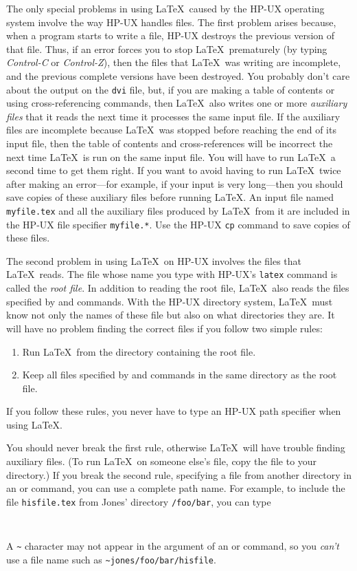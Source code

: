 \documentclass{article}
\begin{document}
The only special problems in using \LaTeX\ caused by the HP-UX
operating system involve the way HP-UX handles files.  The first
problem arises because, when a program starts to write a file, HP-UX
destroys the previous version of that file.  Thus, if an error forces
you to stop \LaTeX\ prematurely (by typing {\em Control-C\/} or {\em
Control-Z\/}), then the files that \LaTeX\ was writing are incomplete,
and the previous complete versions have been destroyed.  You probably
don't care about the output on the {\tt dvi} file, but, if you are
making a table of contents or using cross-referencing commands, then
\LaTeX\ also writes one or more {\em auxiliary files\/} that it reads
the next time it processes the same input file.  If the auxiliary files
are incomplete because \LaTeX\ was stopped before reaching the end of
its input file, then the table of contents and cross-references will be
incorrect the next time \LaTeX\ is run on the same input file.  You
will have to run \LaTeX\ a second time to get them right.  If you want
to avoid having to run \LaTeX\ twice after making an error---for
example, if your input is very long---then you should save copies of
these auxiliary files before running \LaTeX. An input file named
\mbox{\tt myfile.tex} and all the auxiliary files produced by
\LaTeX\ from it are included in the HP-UX file specifier \mbox{\tt myfile.*}.
Use the HP-UX {\tt cp} command to save copies of these files.

The second problem in using \LaTeX\ on HP-UX involves the files that
\LaTeX\ reads.  The file whose name you type with HP-UX's {\tt latex}
command is called the {\em root file}.  In addition to reading the root
file, \LaTeX\ also reads the files specified by \hbox{\verb||}
and \hbox{\verb||} commands.  With the HP-UX directory system,
\LaTeX\ must know not only the names of these file but also on what
directories they are.  It will have no problem finding the correct
files if you follow two simple rules:
\begin{enumerate}
 \item Run \LaTeX\ from the directory containing the root file.
 \item Keep all files specified by \hbox{\verb||} and 
      \hbox{\verb||} commands in the same directory as the root
       file.
\end{enumerate}
If you follow these rules, you never have to type an HP-UX path
specifier when using \LaTeX.

You should never break the first rule, otherwise \LaTeX\ will have
trouble finding auxiliary files.  (To run \LaTeX\ on someone else's
file, copy the file to your directory.) If you break the second
rule, specifying a file from another directory in an
\hbox{\verb||} or \hbox{\verb||} command, you can use a
complete path name.  For example, to include the file
\mbox{\tt hisfile.tex} from Jones' directory \hbox{\verb|/foo/bar|},
you can type
\begin{verbatim}
     
\end{verbatim}
A \verb|~| character may not appear in the argument of an
\hbox{\verb||} or \hbox{\verb||} command, so you {\em
can't\/} use a file name such as \hbox{\verb|~jones/foo/bar/hisfile|}.
\end{document}
